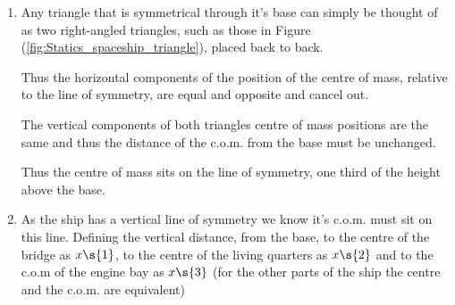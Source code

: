 \begin{problem}
{\begin{enumerate}
	\begin{equation}	d{A} = h~d{x} = \frac{H x~d{x}}{L}  \end{equation}
	
	Total moment $G$, taken around the point $x=0$, satisfies:
	
	\begin{equation}	G = M X = \sum{x~dm} = \sum{\frac{\rho H x^{2} ~dx}{L}}  \end{equation}
	
	As $dx$ goes to zero the sum of finite areas $dA$ goes to a continuous integral:
	
	\begin{equation}	G = \int_0^L \frac{\rho H x^2}{L}~ \d{x} = \frac{\rho H}{L}\left[\frac{x^3}{3}\right]^L_0 = \frac{\rho H L^2}{3}  \end{equation}
	
	Also we know $M = \rho A = \rho \frac{H L}{2}$
	
	And therefore:
	
	\begin{equation}	 \rho \frac{H L}{2} D =  \frac{\rho H L^2}{3} 
	 \Rightarrow D = \frac{2L}{3} \end{equation}
	
	Thus the centre of mass lies two thirds of the distance from the tip, and thus one third of the distance from the base.
	
	\item Any triangle that is symmetrical through it's base can simply be thought of as two right-angled triangles, such as those in Figure (\ref{fig:Statics_spaceship_triangle}), placed back to back.
	
	Thus the horizontal components of the position of the centre of mass, relative to the line of symmetry, are equal and opposite and cancel out.
	
	The vertical components of both triangles centre of mass positions are the same and thus the distance of the c.o.m. from the base must be unchanged.
	
	Thus the centre of mass sits on the line of symmetry, one third of the height above the base.
	
	\item
	
	As the ship has a vertical line of symmetry we know it's c.o.m. must sit on this line. Defining the vertical distance, from the base, to the centre of the bridge as $x\s{1}$, to the centre of the living quarters as $x\s{2}$ and to the c.o.m of the engine bay as $x\s{3}$ (for the other parts of the ship the centre and the c.o.m. are equivalent)
	

\end{enumerate}}
\end{problem}
